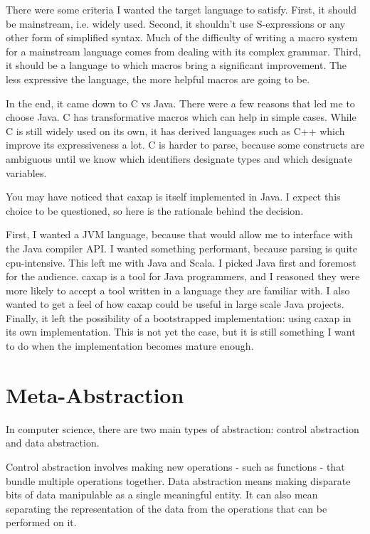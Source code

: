 There were some criteria I wanted the target language to satisfy. First, it
should be mainstream, i.e. widely used. Second, it shouldn't use S-expressions
or any other form of simplified syntax. Much of the difficulty of writing a
macro system for a mainstream language comes from dealing with its complex
grammar. Third, it should be a language to which macros bring a significant
improvement. The less expressive the language, the more helpful macros are going
to be.

In the end, it came down to C vs Java. There were a few reasons that led me to
choose Java. C has transformative macros which can help in simple cases. While C
is still widely used on its own, it has derived languages such as C++ which
improve its expressiveness a lot. C is harder to parse, because some constructs
are ambiguous until we know which identifiers designate types and which
designate variables.

You may have noticed that caxap is itself implemented in Java. I expect this
choice to be questioned, so here is the rationale behind the decision.

First, I wanted a JVM language, because that would allow me to interface with
the Java compiler API. I wanted something performant, because parsing is quite
cpu-intensive. This left me with Java and Scala. I picked Java first and
foremost for the audience. caxap is a tool for Java programmers, and I reasoned
they were more likely to accept a tool written in a language they are familiar
with. I also wanted to get a feel of how caxap could be useful in large scale
Java projects. Finally, it left the possibility of a bootstrapped
implementation: using caxap in its own implementation. This is not yet the case,
but it is still something I want to do when the implementation becomes mature
enough.

\section{Meta-Abstraction}

In computer science, there are two main types of abstraction: control
abstraction and data abstraction. \cite{wiki_abstraction}

Control abstraction involves making new operations - such as functions - that
bundle multiple operations together. Data abstraction means making disparate
bits of data manipulable as a single meaningful entity. It can also mean
separating the representation of the data from the operations that can be
performed on it.

